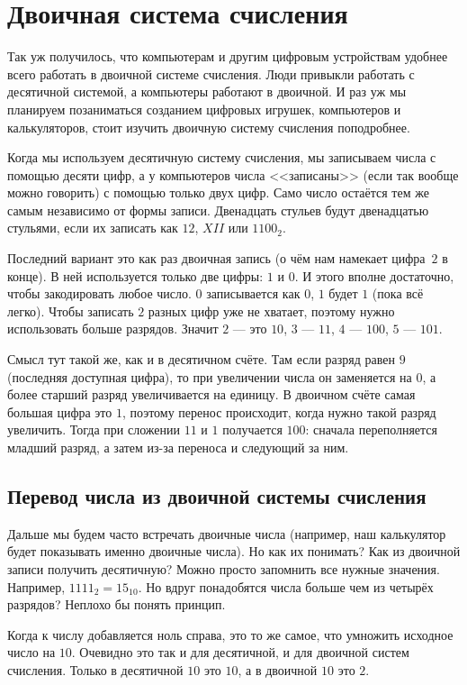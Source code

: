 \chapter{Двоичная система счисления}

Так уж получилось, что компьютерам и другим цифровым устройствам
удобнее всего работать в двоичной системе счисления.
Люди привыкли работать с десятичной системой, а компьютеры работают в двоичной.
И раз уж мы планируем позаниматься созданием цифровых игрушек,
компьютеров и калькуляторов, стоит изучить двоичную систему счисления
поподробнее.

Когда мы используем десятичную систему счисления, мы записываем числа с помощью десяти цифр, а у компьютеров
числа <<записаны>> (если так вообще можно говорить) с помощью только двух цифр.
Само число остаётся тем же самым независимо от формы записи. Двенадцать стульев
будут двенадцатью стульями, если их записать как $12$, $XII$ или $1100_2$.

Последний вариант это как раз двоичная запись (о чём нам намекает цифра~$2$ в конце).
В ней используется только две цифры: $1$ и $0$. И этого вполне достаточно, чтобы закодировать
любое число. $0$ записывается как $0$, $1$ будет $1$ (пока всё легко). Чтобы записать $2$
разных цифр уже не хватает, поэтому нужно использовать больше разрядов. Значит $2$ --- это $10$,
$3$ --- $11$, $4$ --- $100$, $5$ --- $101$.

Смысл тут такой же, как и в десятичном счёте. Там если разряд равен $9$ (последняя доступная цифра),
то при увеличении числа он заменяется на $0$, а более старший разряд увеличивается на единицу.
В двоичном счёте самая большая цифра это $1$, поэтому перенос происходит, когда нужно такой разряд
увеличить. Тогда при сложении $11$ и $1$ получается $100$: сначала переполняется младший разряд,
а затем из-за переноса и следующий за ним.

\section{Перевод числа из двоичной системы счисления}

Дальше мы будем часто встречать двоичные числа (например, наш калькулятор
будет показывать именно двоичные числа). Но как их понимать?
Как из двоичной записи получить десятичную?
Можно просто запомнить все нужные значения. Например, $1111_2=15_{10}$.
Но вдруг понадобятся числа больше чем из четырёх разрядов? Неплохо бы понять принцип.

Когда к числу добавляется ноль справа, это то же самое, что умножить исходное число на $10$.
Очевидно это так и для десятичной, и для двоичной систем счисления. Только в десятичной
$10$ это $10$, а в двоичной $10$ это $2$.

